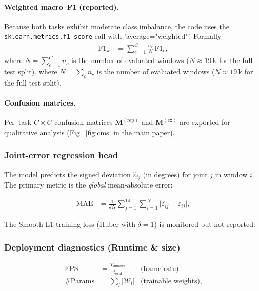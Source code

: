 \documentclass{article}
\begin{document}
\paragraph{Weighted macro–F1 (reported).}
Because both tasks exhibit moderate class imbalance, the code uses the
\verb|sklearn.metrics.f1_score| call with
'average="weighted"'.  
Formally
\begin{align}
  \text{F1}_\text{w} &= \sum_{c=1}^{C} \frac{n_c}{N}\,\text{F1}_c ,
  \label{eq:weighted_f1}     %
\end{align}
where $N=\sum_{c=1}^{C} n_c$ is the number of evaluated windows
($N \approx 19\,\text{k}$ for the full test split).
where $N=\sum_{c}n_c$ is the number of evaluated windows
($N\!\approx\!19\,\text{k}$ for the full test split).

\paragraph{Confusion matrices.}
Per–task $C\times C$ confusion matrices
$\mathbf{M}^{(\text{rep})}$ and
$\mathbf{M}^{(\text{ex})}$ are exported for qualitative
analysis (Fig.~\ref{fig:cms} in the main paper).

\subsubsection{Joint-error regression head}

The model predicts the signed deviation
$\hat{\varepsilon}_{ij}$ (in degrees) for joint $j$ in window $i$.
The primary metric is the \emph{global} mean-absolute error:

\begin{align}
  \text{MAE} &= \frac{1}{J N}\sum_{j=1}^{14}\sum_{i=1}^{N}
               \bigl|\hat{\varepsilon}_{ij}-\varepsilon_{ij}\bigr|,
  \label{eq:mae}            
\end{align}

The Smooth-L1 training loss (Huber with $\delta\!=\!1$) is monitored
but not reported.

\subsubsection{Deployment diagnostics (Runtime & size)}

\begin{align}
  \text{FPS} &=
    \frac{T_\text{dummy}}{t_\text{eval}}
    &\text{(frame rate)}\\[4pt]
  \text{\#Params} &= \sum_{l}\bigl|\mathcal{W}_{l}\bigr|
    &\text{(trainable weights),}
\end{align}
\end{document}
